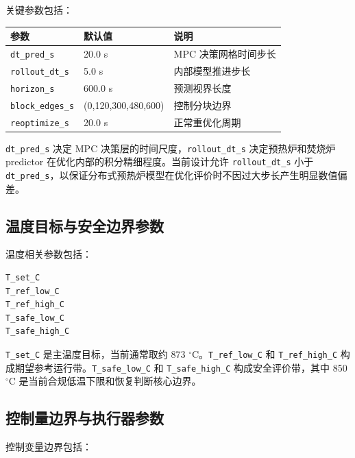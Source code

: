 \documentclass[UTF8,openany,zihao=-4,oneside]{ctexbook}
\providecommand{\passthrough}[1]{#1}
\begin{document}
关键参数包括：

\begin{longtable}[c]{@{}p{}p{}p{}@{}}
\toprule\noalign{}
参数 & 默认值 & 说明 \\
\midrule\noalign{}
\endhead
\bottomrule\noalign{}
\endlastfoot
\passthrough{\lstinline!dt_pred_s!} & 20.0 s & MPC 决策网格时间步长 \\
\passthrough{\lstinline!rollout_dt_s!} & 5.0 s & 内部模型推进步长 \\
\passthrough{\lstinline!horizon_s!} & 600.0 s & 预测视界长度 \\
\passthrough{\lstinline!block_edges_s!} & (0,120,300,480,600) & 控制分块边界 \\
\passthrough{\lstinline!reoptimize_s!} & 20.0 s & 正常重优化周期 \\
\end{longtable}

\passthrough{\lstinline!dt_pred_s!} 决定 MPC 决策层的时间尺度，\passthrough{\lstinline!rollout_dt_s!} 决定预热炉和焚烧炉 predictor 在优化内部的积分精细程度。当前设计允许 \passthrough{\lstinline!rollout_dt_s!} 小于 \passthrough{\lstinline!dt_pred_s!}，以保证分布式预热炉模型在优化评价时不因过大步长产生明显数值偏差。

\subsection{温度目标与安全边界参数}\label{subsec:nmpc-temperature-config}

温度相关参数包括：

\begin{lstlisting}
T_set_C
T_ref_low_C
T_ref_high_C
T_safe_low_C
T_safe_high_C
\end{lstlisting}

\passthrough{\lstinline!T_set_C!} 是主温度目标，当前通常取约 873 \(^\circ\mathrm{C}\)。\passthrough{\lstinline!T_ref_low_C!} 和 \passthrough{\lstinline!T_ref_high_C!} 构成期望参考运行带。\passthrough{\lstinline!T_safe_low_C!} 和 \passthrough{\lstinline!T_safe_high_C!} 构成安全评价带，其中 850 \(^\circ\mathrm{C}\) 是当前合规低温下限和恢复判断核心边界。

\subsection{控制量边界与执行器参数}\label{subsec:nmpc-control-bound-config}

控制变量边界包括：
\end{document}
